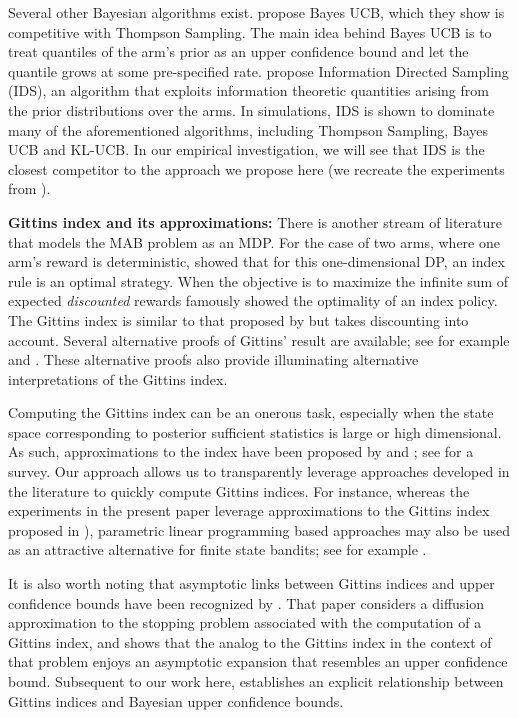 Several other Bayesian algorithms exist. \cite{kaufmann2012thompson} propose Bayes UCB, which they show is competitive with Thompson Sampling. The main idea behind Bayes UCB is to treat quantiles of the arm's prior as an upper confidence bound and let the quantile grows at some pre-specified rate. \cite{russo2014learning} propose Information Directed Sampling (IDS), an algorithm that exploits information theoretic quantities arising from the prior distributions over the arms. In simulations, IDS is shown to dominate many of the aforementioned algorithms, including Thompson Sampling, Bayes UCB and KL-UCB. In our empirical investigation, we will see that IDS is the closest competitor to the approach we propose here (we recreate the experiments from \cite{russo2014learning}).

\noindent\textbf{\textsf{Gittins index and its approximations: }}
There is another stream of literature that models the MAB problem as an MDP. For the case of two arms, where one arm's reward is deterministic, \cite{bradt1956sequential} showed that for this one-dimensional DP, an index rule is an optimal strategy. When the objective is to maximize the infinite sum of expected \emph{discounted} rewards \cite{gittins1979bandit} famously showed the optimality of an index policy. The Gittins index is similar to that proposed by \cite{bradt1956sequential} but takes discounting into account. Several alternative proofs of Gittins' result are available; see for example \citep{tsitsiklis1994short,weber1992gittins,whittle1980multi} and \citep{bertsimas1996conservation}. These alternative proofs also provide illuminating alternative interpretations of the Gittins index.  
 
Computing the Gittins index can be an onerous task, especially when the state space corresponding to posterior sufficient statistics is large or high dimensional. As such, approximations to the index have been proposed by \cite{yao2006some,katehakis1987multi} and \cite{varaiya1985extensions}; see \citep{chakravorty2013multi} for a survey. {\color{blue} Our approach allows us to transparently leverage approaches developed in the literature to quickly compute Gittins indices. For instance, whereas the experiments in the present paper leverage approximations to the Gittins index proposed in \citep{brezzi2002optimal, powell2012optimal}), parametric linear programming based approaches may also be used as an attractive alternative for finite state bandits; see for example \citep{nino20072}.} 

{\color{blue}
It is also worth noting that asymptotic links between Gittins indices and upper confidence bounds have been recognized by \cite{fang1987characterization}. That paper considers a diffusion approximation to the stopping problem associated with the computation of a Gittins index, and shows that the analog to the Gittins index in the context of that problem enjoys an asymptotic expansion that resembles an upper confidence bound. Subsequent to our work here, \cite{russo2019note} establishes an explicit relationship between Gittins indices and Bayesian upper confidence bounds. 
}

